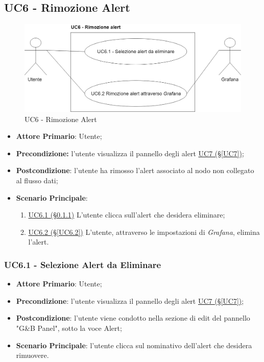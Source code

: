 \newpage

\subsection{UC6 - Rimozione Alert}\label{UC6}

\begin{figure}[H]
	\centering
	\includegraphics[scale=0.4]{./images/UC6.png}
	\caption{UC6 - Rimozione Alert}
\end{figure}

\begin{itemize}
	\item \textbf{Attore Primario}: Utente;
	\item \textbf{Precondizione:} l'utente visualizza il pannello degli alert \hyperref[UC7]{UC7 (§\ref*{UC7})};
	\item \textbf{Postcondizione}: l'utente ha rimosso l'alert associato al nodo non collegato al flusso dati;
	\item \textbf{Scenario Principale}: 
	\begin{enumerate}
		\item \hyperref[UC6.1]{UC6.1 (§\ref*{UC6.1})} L'utente clicca sull'alert che desidera eliminare;
		\item \hyperref[UC6.2]{UC6.2 (§\ref*{UC6.2})} L'utente, attraverso le impostazioni di \textit{Grafana}, elimina l'alert.
	\end{enumerate}
\end{itemize}

\subsubsection{UC6.1 - Selezione Alert da Eliminare}\label{UC6.1}
\begin{itemize}
	\item \textbf{Attore Primario}: Utente;
	\item \textbf{Precondizione}:  l'utente visualizza il pannello degli alert \hyperref[UC7]{UC7 (§\ref*{UC7})};
	\item \textbf{Postcondizione}: l'utente viene condotto nella sezione di edit del pannello "G\&B Panel", sotto la voce Alert;
	\item \textbf{Scenario Principale}: l'utente clicca sul nominativo dell'alert che desidera rimuovere.
\end{itemize}

